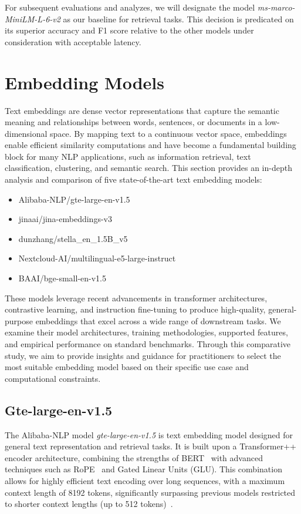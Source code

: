 For subsequent evaluations and analyzes, we will designate the model \textit{ms-marco-MiniLM-L-6-v2} as our baseline for retrieval tasks.
This decision is predicated on its superior accuracy and F1 score relative to the other models under consideration with acceptable latency.


\section{Embedding Models}\label{sec:embedding-models}
Text embeddings are dense vector representations that capture the semantic meaning and relationships between words, sentences, or documents in a low-dimensional space.
By mapping text to a continuous vector space, embeddings enable efficient similarity computations and have become a fundamental building block for many NLP applications, such as information retrieval, text classification, clustering, and semantic search.
This section provides an in-depth analysis and comparison of five state-of-the-art text embedding models:

\begin{itemize}
    \item Alibaba-NLP/gte-large-en-v1.5
    \item jinaai/jina-embeddings-v3
    \item dunzhang/stella\_en\_1.5B\_v5
    \item Nextcloud-AI/multilingual-e5-large-instruct
    \item BAAI/bge-small-en-v1.5
\end{itemize}

These models leverage recent advancements in transformer architectures, contrastive learning, and instruction fine-tuning to produce high-quality, general-purpose embeddings that excel across a wide range of downstream tasks.
We examine their model architectures, training methodologies, supported features, and empirical performance on standard benchmarks.
Through this comparative study, we aim to provide insights and guidance for practitioners to select the most suitable embedding model based on their specific use case and computational constraints.

\subsection{Gte-large-en-v1.5}\label{subsec:alibaba-nlp}
The Alibaba-NLP model \textit{gte-large-en-v1.5} is text embedding model designed for general text representation and retrieval tasks.
It is built upon a Transformer++ encoder architecture, combining the strengths of BERT~\cite{devlin2019bertpretrainingdeepbidirectional} with advanced techniques such as \ac{RoPE}~\cite{su2023roformerenhancedtransformerrotary} and Gated Linear Units (GLU).
This combination allows for highly efficient text encoding over long sequences, with a maximum context length of 8192 tokens, significantly surpassing previous models restricted to shorter context lengths (up to 512 tokens)~\cite{zhang2024mgtegeneralizedlongcontexttext}.

